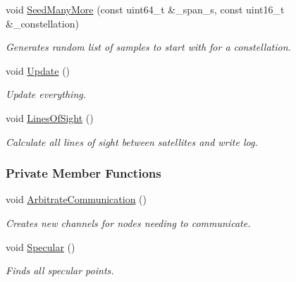 \begin{DoxyCompactItemize}
void \hyperlink{classosse_1_1collaborate_1_1_observing_system_alpha_ad720f4060e443b244540333b6e5d27a8}{Seed\+Many\+More} (const uint64\+\_\+t \&\+\_\+span\+\_\+s, const uint16\+\_\+t \&\+\_\+constellation)
\begin{DoxyCompactList}\small\item\em Generates random list of samples to start with for a constellation. \end{DoxyCompactList}\item 
\mbox{\label{classosse_1_1collaborate_1_1_observing_system_alpha_aa08dadc203f46736cc75d4a1a5ef60f8}} 
void \hyperlink{classosse_1_1collaborate_1_1_observing_system_alpha_aa08dadc203f46736cc75d4a1a5ef60f8}{Update} ()
\begin{DoxyCompactList}\small\item\em Update everything. \end{DoxyCompactList}\item 
\mbox{\label{classosse_1_1collaborate_1_1_observing_system_alpha_a8a7798f3de1f2b96524d1457d9f3143f}} 
void \hyperlink{classosse_1_1collaborate_1_1_observing_system_alpha_a8a7798f3de1f2b96524d1457d9f3143f}{Lines\+Of\+Sight} ()
\begin{DoxyCompactList}\small\item\em Calculate all lines of sight between satellites and write log. \end{DoxyCompactList}\end{DoxyCompactItemize}
\subsubsection*{Private Member Functions}
\begin{DoxyCompactItemize}
\item 
\mbox{\label{classosse_1_1collaborate_1_1_observing_system_alpha_a19bf647d15aeb16d71082e1aef2ba140}} 
void \hyperlink{classosse_1_1collaborate_1_1_observing_system_alpha_a19bf647d15aeb16d71082e1aef2ba140}{Arbitrate\+Communication} ()
\begin{DoxyCompactList}\small\item\em Creates new channels for nodes needing to communicate. \end{DoxyCompactList}\item 
\mbox{\label{classosse_1_1collaborate_1_1_observing_system_alpha_a28f5ffebc95dc94c95de69732ce8ee29}} 
void \hyperlink{classosse_1_1collaborate_1_1_observing_system_alpha_a28f5ffebc95dc94c95de69732ce8ee29}{Specular} ()
\begin{DoxyCompactList}\small\item\em Finds all specular points. \end{DoxyCompactList}\end{DoxyCompactItemize}
